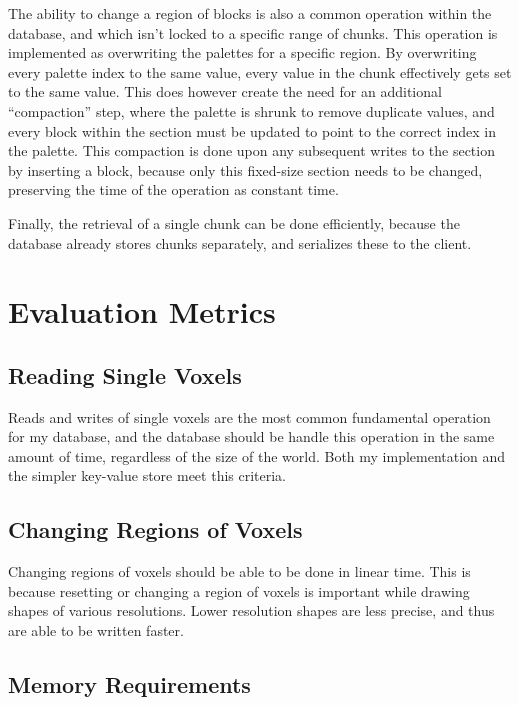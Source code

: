 \documentclass[10pt,twocolumn]{article}
\begin{document}
The ability to change a region of blocks is also a common operation within the
database, and which isn't locked to a specific range of chunks. This operation
is implemented as overwriting the palettes for a specific region. By overwriting
every palette index to the same value, every value in the chunk effectively gets
set to the same value. This does however create the need for an additional
``compaction'' step, where the palette is shrunk to remove duplicate values, and
every block within the section must be updated to point to the correct index in
the palette. This compaction is done upon any subsequent writes to the section
by inserting a block, because only this fixed-size section needs to be changed,
preserving the time of the operation as constant time.

Finally, the retrieval of a single chunk can be done efficiently, because the
database already stores chunks separately, and serializes these to the client.


\section{Evaluation Metrics}

\subsection{Reading Single Voxels}

Reads and writes of single voxels are the most common fundamental operation for
my database, and the database should be handle this operation in the same amount
of time, regardless of the size of the world. Both my implementation and the
simpler key-value store meet this criteria.

\subsection{Changing Regions of Voxels}

Changing regions of voxels should be able to be done in linear time. This is
because resetting or changing a region of voxels is important while drawing
shapes of various resolutions. Lower resolution shapes are less precise, and
thus are able to be written faster.

\subsection{Memory Requirements}
\end{document}
